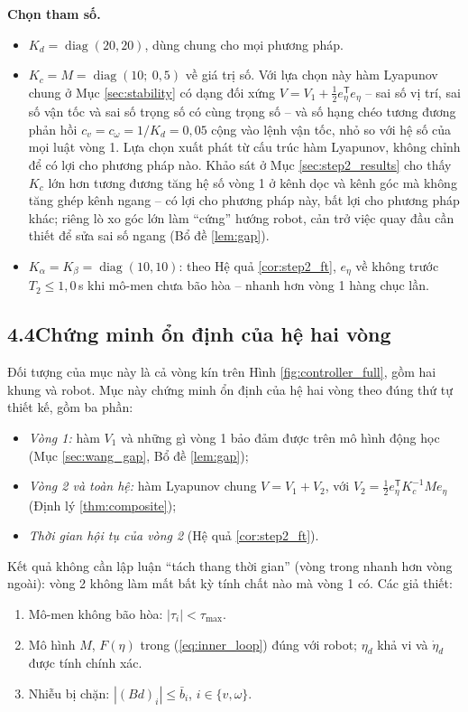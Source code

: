 \documentclass[12pt,a4paper]{article}
\makeatletter
\newcommand{\seclabel}[2]{\phantomsection\protected@edef\@currentlabel{#2}\label{#1}}
\newcommand{\T}{\mathsf{T}}
\DeclareMathOperator{\diag}{diag}
\makeatother
\begin{document}
\textbf{Chọn tham số.}
\begin{itemize}
    \item $K_d = \diag(20, 20)$, dùng chung cho mọi phương pháp.
    \item $K_c = M = \diag(10;\ 0{,}5)$ về giá trị số. Với lựa chọn này hàm Lyapunov chung ở Mục \ref{sec:stability} có dạng đối xứng $V = V_1 + \frac12 e_\eta^\T e_\eta$ -- sai số vị trí, sai số vận tốc và sai số trọng số có cùng trọng số -- và số hạng chéo tương đương phản hồi $c_v = c_\omega = 1/K_d = 0{,}05$ cộng vào lệnh vận tốc, nhỏ so với hệ số của mọi luật vòng 1. Lựa chọn xuất phát từ cấu trúc hàm Lyapunov, không chỉnh để có lợi cho phương pháp nào. Khảo sát ở Mục \ref{sec:step2_results} cho thấy $K_c$ lớn hơn tương đương tăng hệ số vòng 1 ở kênh dọc và kênh góc mà không tăng ghép kênh ngang -- có lợi cho phương pháp này, bất lợi cho phương pháp khác; riêng lò xo góc lớn làm ``cứng'' hướng robot, cản trở việc quay đầu cần thiết để sửa sai số ngang (Bổ đề \ref{lem:gap}).
    \item $K_\alpha = K_\beta = \diag(10, 10)$: theo Hệ quả \ref{cor:step2_ft}, $e_\eta$ về không trước $T_2 \leq 1{,}0$\,s khi mô-men chưa bão hòa -- nhanh hơn vòng 1 hàng chục lần.
\end{itemize}

\subsection*{4.4\quad Chứng minh ổn định của hệ hai vòng}
\seclabel{sec:stability}{4.4}

Đối tượng của mục này là cả vòng kín trên Hình \ref{fig:controller_full}, gồm hai khung và robot. Mục này chứng minh ổn định của hệ hai vòng theo đúng thứ tự thiết kế, gồm ba phần:
\begin{itemize}[nosep]
    \item \textit{Vòng 1:} hàm $V_1$ và những gì vòng 1 bảo đảm được trên mô hình động học (Mục \ref{sec:wang_gap}, Bổ đề \ref{lem:gap});
    \item \textit{Vòng 2 và toàn hệ:} hàm Lyapunov chung $V = V_1 + V_2$, với $V_2 = \frac12 e_\eta^\T K_c^{-1}Me_\eta$ (Định lý \ref{thm:composite});
    \item \textit{Thời gian hội tụ của vòng 2} (Hệ quả \ref{cor:step2_ft}).
\end{itemize}
Kết quả không cần lập luận ``tách thang thời gian'' (vòng trong nhanh hơn vòng ngoài): vòng 2 không làm mất bất kỳ tính chất nào mà vòng 1 có. Các giả thiết:
\begin{enumerate}[label=(A\arabic*), nosep]
    \item Mô-men không bão hòa: $|\tau_i| < \tau_{\max}$.
    \item Mô hình $M$, $F(\eta)$ trong (\ref{eq:inner_loop}) đúng với robot; $\eta_d$ khả vi và $\dot\eta_d$ được tính chính xác.
    \item Nhiễu bị chặn: $|(Bd)_i| \leq \bar b_i$, $i \in \{v, \omega\}$.
\end{enumerate}
\end{document}
